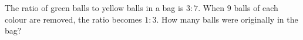 The ratio of green balls to yellow balls in a bag is $3:7$. When $9$ balls of each colour are removed, the ratio becomes $1:3$. How many balls were originally in the bag?
